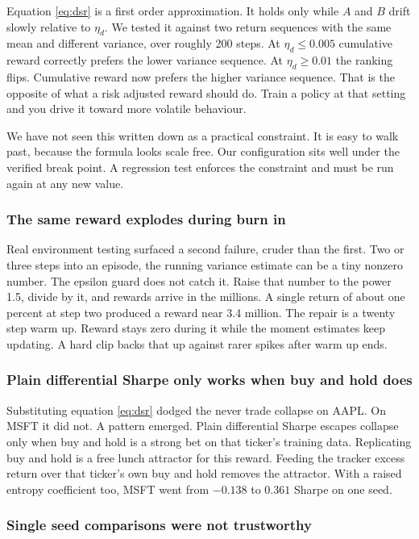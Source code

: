 \documentclass[conference]{IEEEtran}
\begin{document}
Equation \ref{eq:dsr} is a first order approximation. It holds only while $A$ and $B$ drift slowly relative to $\eta_d$. We tested it against two return sequences with the same mean and different variance, over roughly 200 steps. At $\eta_d \le 0.005$ cumulative reward correctly prefers the lower variance sequence. At $\eta_d \ge 0.01$ the ranking flips. Cumulative reward now prefers the higher variance sequence. That is the opposite of what a risk adjusted reward should do. Train a policy at that setting and you drive it toward more volatile behaviour.

We have not seen this written down as a practical constraint. It is easy to walk past, because the formula looks scale free. Our configuration sits well under the verified break point. A regression test enforces the constraint and must be run again at any new value.

\subsubsection{The same reward explodes during burn in}

Real environment testing surfaced a second failure, cruder than the first. Two or three steps into an episode, the running variance estimate can be a tiny nonzero number. The epsilon guard does not catch it. Raise that number to the power 1.5, divide by it, and rewards arrive in the millions. A single return of about one percent at step two produced a reward near 3.4 million. The repair is a twenty step warm up. Reward stays zero during it while the moment estimates keep updating. A hard clip backs that up against rarer spikes after warm up ends.

\subsubsection{Plain differential Sharpe only works when buy and hold does}

Substituting equation \ref{eq:dsr} dodged the never trade collapse on AAPL. On MSFT it did not. A pattern emerged. Plain differential Sharpe escapes collapse only when buy and hold is a strong bet on that ticker's training data. Replicating buy and hold is a free lunch attractor for this reward. Feeding the tracker excess return over that ticker's own buy and hold removes the attractor. With a raised entropy coefficient too, MSFT went from $-0.138$ to $0.361$ Sharpe on one seed.

\subsubsection{Single seed comparisons were not trustworthy}
\end{document}
